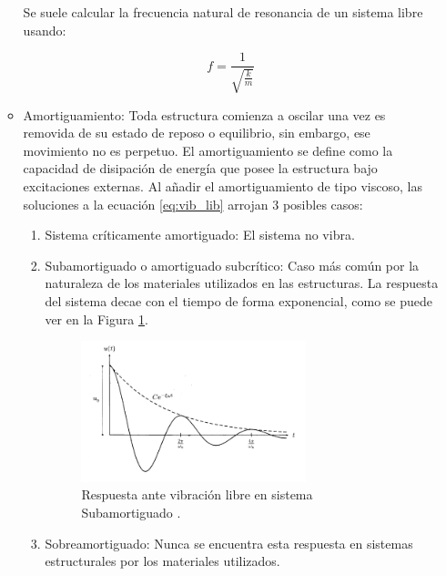 \begin{itemize}
\begin{itemize}
                Se suele calcular la frecuencia natural de resonancia de un sistema libre usando:

                \begin{equation}
                    f =  \frac{1}{\sqrt{\frac{k}{m}}}
                \end{equation}

            \item Amortiguamiento: Toda estructura comienza a oscilar una vez es removida de su estado de reposo o equilibrio, sin embargo, ese movimiento no es perpetuo. El amortiguamiento se define como la capacidad de disipación de energía que posee la estructura bajo excitaciones externas. Al añadir el amortiguamiento de tipo viscoso, las soluciones a la ecuación \ref{eq:vib_lib} arrojan 3 posibles casos:
                \begin{enumerate}
                    \item Sistema críticamente amortiguado: El sistema no vibra.
                    \item Subamortiguado o amortiguado subcrítico: Caso más común por la naturaleza de los materiales utilizados en las estructuras. La respuesta del sistema decae con el tiempo de forma exponencial, como se puede ver en la Figura \ref{fig:resp_subamorti}. 
                    
                    \begin{figure}[H]
                        \centering
                        \includegraphics[width = 0.7\textwidth]{imagenes/cap1_marcoteo/respuesta_sist_subamorti.png}
                        \caption{Respuesta ante vibración libre en sistema Subamortiguado \citep{hurtado2000}.}
                        \label{fig:resp_subamorti}
                    \end{figure}

                    \item Sobreamortiguado: Nunca se encuentra esta respuesta en sistemas estructurales por los materiales utilizados.
                \end{enumerate}
            
        \end{itemize}        
\end{itemize}

